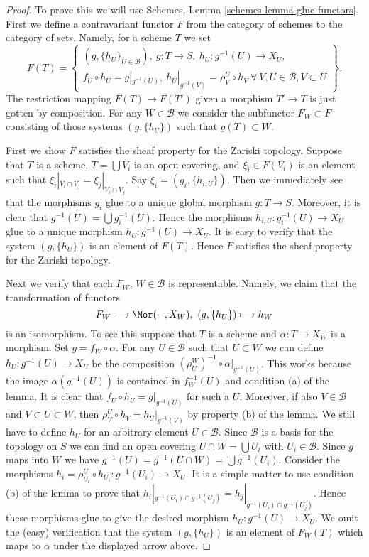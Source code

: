 \begin{proof}
To prove this we will use Schemes, Lemma \ref{schemes-lemma-glue-functors}.
First we define a contravariant functor $F$ from the category of schemes
to the category of sets. Namely, for a scheme $T$ we set
$$
F(T) =
\left\{
\begin{matrix}
(g, \{h_U\}_{U \in \mathcal{B}}),
\ g : T \to S, \ h_U : g^{-1}(U) \to X_U, \\
f_U \circ h_U = g|_{g^{-1}(U)},
\ h_U|_{g^{-1}(V)} = \rho^U_V \circ h_V
\ \forall\ V, U \in \mathcal{B}, V \subset U
\end{matrix}
\right\}.
$$
The restriction mapping $F(T) \to F(T')$ given a morphism
$T' \to T$ is just gotten by composition.
For any $W \in \mathcal{B}$ we consider the subfunctor
$F_W \subset F$ consisting of those systems $(g, \{h_U\})$
such that $g(T) \subset W$.

\medskip\noindent
First we show $F$ satisfies the sheaf property for the Zariski topology.
Suppose that $T$ is a scheme, $T = \bigcup V_i$ is an open covering,
and $\xi_i \in F(V_i)$ is an element such that
$\xi_i|_{V_i \cap V_j} = \xi_j|_{V_i \cap V_j}$.
Say $\xi_i = (g_i, \{h_{i, U}\})$. Then we immediately see that
the morphisms $g_i$ glue to a unique global morphism
$g : T \to S$. Moreover, it is clear that
$g^{-1}(U) = \bigcup g_i^{-1}(U)$. Hence the morphisms
$h_{i, U} : g_i^{-1}(U) \to X_U$ glue to a unique morphism
$h_U : g^{-1}(U) \to X_U$. It is easy to verify that the system
$(g, \{h_U\})$ is an element of $F(T)$. Hence $F$ satisfies the
sheaf property for the Zariski topology.

\medskip\noindent
Next we verify that each $F_W$, $W \in \mathcal{B}$ is representable.
Namely, we claim that the transformation of functors
$$
F_W \longrightarrow \Mor(-, X_W), \ (g, \{h_U\}) \longmapsto h_W
$$
is an isomorphism. To see this suppose that $T$ is a scheme and
$\alpha : T \to X_W$ is a morphism. Set $g = f_W \circ \alpha$.
For any $U \in \mathcal{B}$ such that $U \subset W$ we can
define $h_U : g^{-1}(U) \to X_U$ be the composition
$(\rho^W_U)^{-1} \circ \alpha|_{g^{-1}(U)}$. This works because
the image $\alpha(g^{-1}(U))$ is contained in $f_W^{-1}(U)$ and
condition (a) of the lemma. It is clear that
$f_U \circ h_U = g|_{g^{-1}(U)}$ for such a $U$.
Moreover, if also $V \in \mathcal{B}$ and $V \subset U \subset W$,
then $\rho^U_V \circ h_V = h_U|_{g^{-1}(V)}$ by property (b)
of the lemma. We still have to define $h_U$ for an arbitrary
element $U \in \mathcal{B}$. Since $\mathcal{B}$ is a basis for
the topology on $S$ we can find an open covering
$U \cap W = \bigcup U_i$ with $U_i \in \mathcal{B}$. Since $g$ maps into $W$
we have
$g^{-1}(U) = g^{-1}(U \cap W) = \bigcup g^{-1}(U_i)$.
Consider the morphisms
$h_i = \rho^U_{U_i} \circ h_{U_i} : g^{-1}(U_i) \to X_U$.
It is a simple matter to use condition (b) of the lemma
to prove that
$h_i|_{g^{-1}(U_i) \cap g^{-1}(U_j)} = h_j|_{g^{-1}(U_i) \cap g^{-1}(U_j)}$.
Hence these morphisms glue to give the desired morphism
$h_U : g^{-1}(U) \to X_U$. We omit the (easy) verification that
the system $(g, \{h_U\})$ is an element of $F_W(T)$ which
maps to $\alpha$ under the displayed arrow above.


\end{proof}
